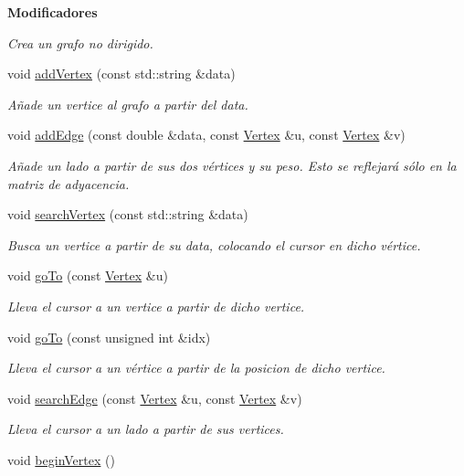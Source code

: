 \begin{Indent}{\bf Modificadores}
\begin{DoxyCompactItemize}
\begin{DoxyCompactList}\small\item\em Crea un grafo no dirigido. \end{DoxyCompactList}\item 
void \hyperlink{classedi_1_1GraphMatrix_aebaa11e964daeb3acad4f3323de6cf41}{add\+Vertex} (const std\+::string \&data)
\begin{DoxyCompactList}\small\item\em Añade un vertice al grafo a partir del data. \end{DoxyCompactList}\item 
void \hyperlink{classedi_1_1GraphMatrix_a4d279468014243cadb53a8a0dceda37b}{add\+Edge} (const double \&data, const \hyperlink{classedi_1_1Vertex}{Vertex} \&u, const \hyperlink{classedi_1_1Vertex}{Vertex} \&v)
\begin{DoxyCompactList}\small\item\em Añade un lado a partir de sus dos vértices y su peso. Esto se reflejará sólo en la matriz de adyacencia. \end{DoxyCompactList}\item 
void \hyperlink{classedi_1_1GraphMatrix_a8f8ca30098dfb76f7f0c0a1f5a1adcbf}{search\+Vertex} (const std\+::string \&data)
\begin{DoxyCompactList}\small\item\em Busca un vertice a partir de su data, colocando el cursor en dicho vértice. \end{DoxyCompactList}\item 
void \hyperlink{classedi_1_1GraphMatrix_a7ca8e3444dc2a916391a9e5844c7afb1}{go\+To} (const \hyperlink{classedi_1_1Vertex}{Vertex} \&u)
\begin{DoxyCompactList}\small\item\em Lleva el cursor a un vertice a partir de dicho vertice. \end{DoxyCompactList}\item 
void \hyperlink{classedi_1_1GraphMatrix_ab1123174f109935506edcfe8f1e3b1cc}{go\+To} (const unsigned int \&idx)
\begin{DoxyCompactList}\small\item\em Lleva el cursor a un vértice a partir de la posicion de dicho vertice. \end{DoxyCompactList}\item 
void \hyperlink{classedi_1_1GraphMatrix_a61499ae6d16bca67e095a752d757eee5}{search\+Edge} (const \hyperlink{classedi_1_1Vertex}{Vertex} \&u, const \hyperlink{classedi_1_1Vertex}{Vertex} \&v)
\begin{DoxyCompactList}\small\item\em Lleva el cursor a un lado a partir de sus vertices. \end{DoxyCompactList}\item 
\hypertarget{classedi_1_1GraphMatrix_a593a5962f154a54e6dc732683edd3db5}{}void \hyperlink{classedi_1_1GraphMatrix_a593a5962f154a54e6dc732683edd3db5}{begin\+Vertex} ()\label{classedi_1_1GraphMatrix_a593a5962f154a54e6dc732683edd3db5}


\end{DoxyCompactItemize}
\end{Indent}
